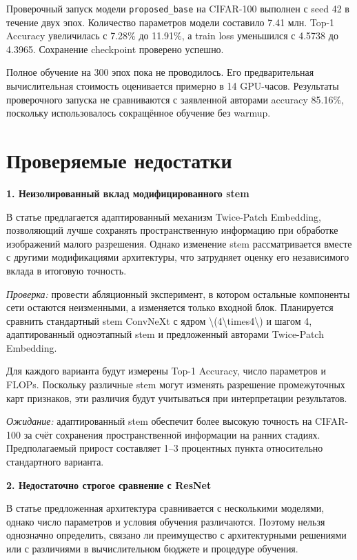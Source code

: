 \documentclass[11pt,a4paper]{article}
\begin{document}
Проверочный запуск модели \texttt{proposed\_base}
на CIFAR-100 выполнен с seed 42 в течение
двух эпох. Количество параметров модели
составило 7.41 млн. Top-1 Accuracy увеличилась
с 7.28\% до 11.91\%, а train loss уменьшился
с 4.5738 до 4.3965. Сохранение checkpoint
проверено успешно.

Полное обучение на 300 эпох пока не проводилось.
Его предварительная вычислительная стоимость
оценивается примерно в 14 GPU-часов.
Результаты проверочного запуска не сравниваются
с заявленной авторами accuracy 85.16\%,
поскольку использовалось сокращённое обучение
без warmup.

\section{Проверяемые недостатки}

\textbf{1. Неизолированный вклад модифицированного stem }

В статье предлагается адаптированный механизм Twice-Patch Embedding, позволяющий лучше сохранять пространственную информацию при обработке изображений малого разрешения. Однако изменение stem рассматривается вместе с другими модификациями архитектуры, что затрудняет оценку его независимого вклада в итоговую точность. 

\textit{Проверка:}
провести абляционный эксперимент, в котором остальные компоненты сети остаются неизменными, а изменяется только входной блок. Планируется сравнить стандартный stem ConvNeXt с ядром \textbackslash{}(4\textbackslash{}times4\textbackslash{}) и шагом 4, адаптированный одноэтапный stem и предложенный авторами Twice-Patch Embedding. 

Для каждого варианта будут измерены Top-1 Accuracy, число параметров и FLOPs. Поскольку различные stem могут изменять разрешение промежуточных карт признаков, эти различия будут учитываться при интерпретации результатов. 

\textit{Ожидание:}
адаптированный stem обеспечит более высокую точность на CIFAR-100 за счёт сохранения пространственной информации на ранних стадиях. Предполагаемый прирост составляет 1–3 процентных пункта относительно стандартного варианта. 

\medskip
\textbf{2. Недостаточно строгое сравнение с ResNet }

В статье предложенная архитектура сравнивается с несколькими моделями, однако число параметров и условия обучения различаются. Поэтому нельзя однозначно определить, связано ли преимущество с архитектурными решениями или с различиями в вычислительном бюджете и процедуре обучения. 
\end{document}

